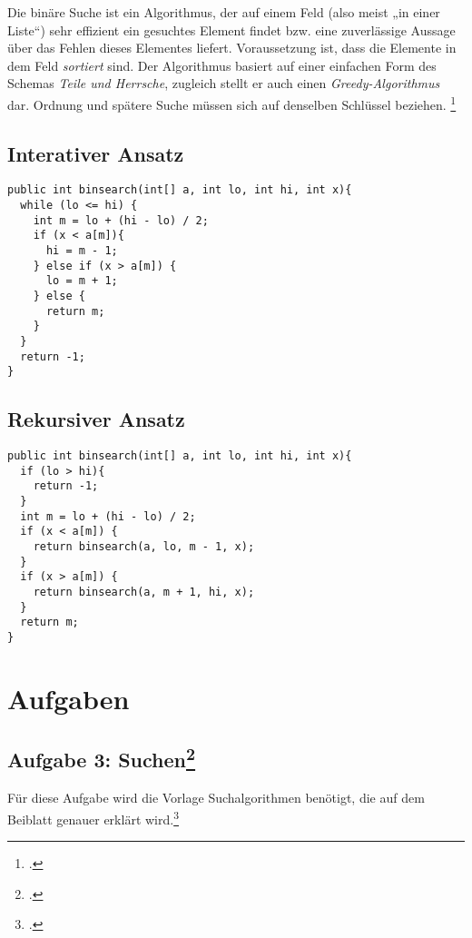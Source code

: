 \documentclass{lehramt-informatik}
\begin{document}
Die binäre Suche ist ein Algorithmus, der auf einem Feld (also meist „in
einer Liste“) sehr effizient ein gesuchtes Element findet bzw. eine
zuverlässige Aussage über das Fehlen dieses Elementes liefert.
Voraussetzung ist, dass die Elemente in dem Feld \emph{sortiert} sind.
Der Algorithmus basiert auf einer einfachen Form des Schemas \emph{Teile
und Herrsche}, zugleich stellt er auch einen \emph{Greedy-Algorithmus}
dar. Ordnung und spätere Suche müssen sich auf denselben Schlüssel
beziehen.
\footcite{wiki:binaere-suche}

\cite[Seite 17 (PDF 9)]{aud:fs:2}

\section{Interativer Ansatz}

\begin{verbatim}
public int binsearch(int[] a, int lo, int hi, int x){
  while (lo <= hi) {
    int m = lo + (hi - lo) / 2;
    if (x < a[m]){
      hi = m - 1;
    } else if (x > a[m]) {
      lo = m + 1;
    } else {
      return m;
    }
  }
  return -1;
}
\end{verbatim}

\section{Rekursiver Ansatz}

\begin{verbatim}
public int binsearch(int[] a, int lo, int hi, int x){
  if (lo > hi){
    return -1;
  }
  int m = lo + (hi - lo) / 2;
  if (x < a[m]) {
    return binsearch(a, lo, m - 1, x);
  }
  if (x > a[m]) {
    return binsearch(a, m + 1, hi, x);
  }
  return m;
}
\end{verbatim}


\chapter{Aufgaben}

\section{Aufgabe 3: Suchen\footcite{aud:ab:2}}

Für diese Aufgabe wird die Vorlage Suchalgorithmen benötigt, die auf dem
Beiblatt genauer erklärt wird.\footcite{Diese Aufgabe stammt aus dem
Übungsblatt 1 zu Algorithmen und Datenstrukturen von Prof. Dr. Martin
Hennecke und Rainer Gall an der Universität Würzburg und wurde
dankenswerterweise zur Verwendung in diesem Aufgabenblatt zur Verfügung
gestellt.}
\end{document}
